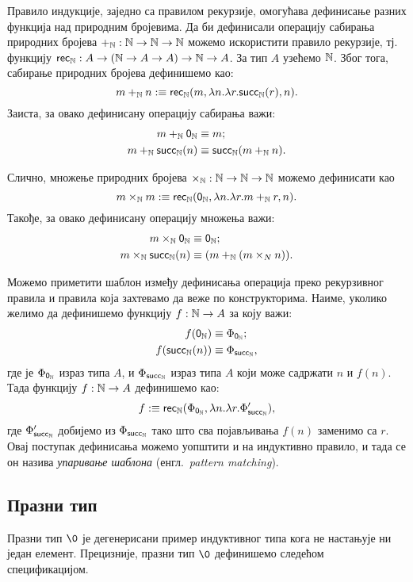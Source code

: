 \documentclass[12pt,oneside]{memoir}
\begin{document}
Правило индукције, заједно са правилом рекурзије, омогућава дефинисање разних функција над природним бројевима. Да би дефинисали операцију сабирања природних бројева $+_{{\mathbb{N}}} : {\mathbb{N}} \to {\mathbb{N}} \to {\mathbb{N}}$ можемо искористити правило рекурзије, тј. функцију $\mathsf{rec}_{{\mathbb{N}}}: A \to ({\mathbb{N}} \to A \to A) \to {\mathbb{N}} \to A$. За тип $A$ узећемо ${\mathbb{N}}$. Због тога, сабирање природних бројева дефинишемо као:
\[m +_{{\mathbb{N}}} n :\equiv \mathsf{rec}_{{\mathbb{N}}} (m, \lambda n.\lambda r.\mathsf{succ}_\mathbb{N}(r), n).\] 
Заиста, за овако дефинисану операцију сабирања важи:
\begin{align*}
    m +_{{\mathbb{N}}} \mathsf{0}_\mathbb{N}{} &\equiv{} m; \\
    m +_{{\mathbb{N}}} \mathsf{succ}_\mathbb{N}(n) &\equiv{} \mathsf{succ}_\mathbb{N}(m +_{{\mathbb{N}}} n).
\end{align*}

Слично, множење природних бројева $\times_{{\mathbb{N}}} : {\mathbb{N}} \to {\mathbb{N}} \to {\mathbb{N}}$ можемо дефинисати као 
\[m \times_{{\mathbb{N}}} m :\equiv \mathsf{rec}_{{\mathbb{N}}} (\mathsf{0}_\mathbb{N}, \lambda n.\lambda r.m +_{{\mathbb{N}}} r, n).\] 
Такође, за овако дефинисану операцију множења важи:
\begin{align*}
    m \times_{{\mathbb{N}}} \mathsf{0}_\mathbb{N}{} &\equiv{} \mathsf{0}_\mathbb{N}{}; \\
    m \times_{{\mathbb{N}}} \mathsf{succ}_\mathbb{N}(n) &\equiv{} (m +_{{\mathbb{N}}} (m \times_{N} n)).
\end{align*}

Можемо приметити шаблон између дефинисања операција преко рекурзивног правила и правила која захтевамо да веже по конструкторима. Наиме, уколико желимо да дефинишемо функцију $f : {\mathbb{N}} \to A$ за коју важи:
\begin{align*}
    f (\mathsf{0}_\mathbb{N}) &\equiv{} \Phi_{\mathsf{0}_\mathbb{N}}; \\
    f (\mathsf{succ}_\mathbb{N}(n)) &\equiv{} \Phi_{\mathsf{succ}_\mathbb{N}},
\end{align*}
где је $\Phi_{\mathsf{0}_\mathbb{N}}$ израз типа $A$, и $\Phi_{\mathsf{succ}_\mathbb{N}}$ израз типа $A$ који може садржати $n$ и $f(n)$. Тада функцију $f : {\mathbb{N}} \to A$ дефинишемо као: 
\[f :\equiv \mathsf{rec}_{{\mathbb{N}}} ({\Phi}_{\mathsf{0}_\mathbb{N}}, \lambda n. \lambda r. \Phi_{\mathsf{succ}_\mathbb{N}}'),\] 
где $\Phi_{\mathsf{succ}_\mathbb{N}}'$ добијемо из $\Phi_{\mathsf{succ}_\mathbb{N}}$ тако што сва појављивања $f(n)$ заменимо са $r$. Овај поступак дефинисања можемо уопштити и на индуктивно правило, и тада се он назива \emph{упаривање шаблона} (енгл.~\emph{pattern matching}).

\subsection{Празни тип}

Празни тип $\0$ је дегенерисани пример индуктивног типа кога не настањује ни један елемент. Прецизније, празни тип $\0$ дефинишемо следећом спецификацијом.
\end{document}

